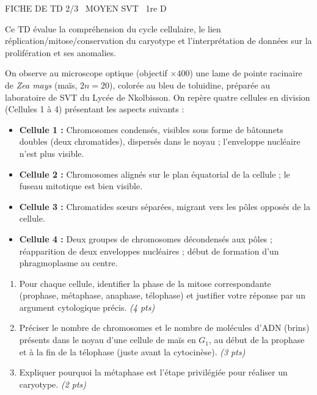 \documentclass[11pt]{article}
\begin{document}
\begin{tcolorbox}[enhanced,colback=popink,colframe=popink,arc=10pt,boxrule=0pt,left=12pt,right=12pt,top=9pt,bottom=9pt]
{\color{white}\popxbold\small FICHE DE TD 2/3 \textbullet\ MOYEN \hfill SVT \textbullet\ 1re D\par}
\end{tcolorbox}
\vspace{4pt}
\noindent Ce TD évalue la compréhension du cycle cellulaire, le lien réplication/mitose/conservation du caryotype et l'interprétation de données sur la prolifération et ses anomalies.

\begin{exercice}
On observe au microscope optique (objectif $\times 400$) une lame de pointe racinaire de \textit{Zea mays} (maïs, $2n = 20$), colorée au bleu de toluidine, préparée au laboratoire de SVT du Lycée de Nkolbisson. On repère quatre cellules en division (Cellules 1 à 4) présentant les aspects suivants :
\begin{itemize}
    \item \textbf{Cellule 1 :} Chromosomes condensés, visibles sous forme de bâtonnets doubles (deux chromatides), dispersés dans le noyau ; l'enveloppe nucléaire n'est plus visible.
    \item \textbf{Cellule 2 :} Chromosomes alignés sur le plan équatorial de la cellule ; le fuseau mitotique est bien visible.
    \item \textbf{Cellule 3 :} Chromatides sœurs séparées, migrant vers les pôles opposés de la cellule.
    \item \textbf{Cellule 4 :} Deux groupes de chromosomes décondensés aux pôles ; réapparition de deux enveloppes nucléaires ; début de formation d'un phragmoplasme au centre.
\end{itemize}
\begin{enumerate}
    \item Pour chaque cellule, identifier la phase de la mitose correspondante (prophase, métaphase, anaphase, télophase) et justifier votre réponse par un argument cytologique précis. \textit{(4 pts)}
    \item Préciser le nombre de chromosomes et le nombre de molécules d'ADN (brins) présents dans le noyau d'une cellule de maïs en $G_1$, au début de la prophase et à la fin de la télophase (juste avant la cytocinèse). \textit{(3 pts)}
    \item Expliquer pourquoi la métaphase est l'étape privilégiée pour réaliser un caryotype. \textit{(2 pts)}
\end{enumerate}
\end{exercice}
\end{document}
